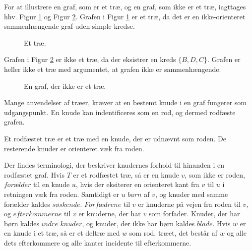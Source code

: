 \begin{exmp}
For at illustrere en graf, som er et træ, og en graf, som ikke er et træ, iagttages hhv. Figur \ref{eksempel_tree} og Figur \ref{eksempel_notree}. Grafen i Figur \ref{eksempel_tree} er et træ, da det er en ikke-orienteret sammenhængende graf uden simple kredse.
\end{exmp}

\begin{figure}[h]
\centering
{}
\caption{Et træ.} 
\label{eksempel_tree}
\end{figure}

Grafen i Figur \ref{eksempel_notree} er ikke et træ, da der eksistrer en kreds $\lbrace B, D, C \rbrace$. Grafen er heller ikke et træ med argumentet, at grafen ikke er sammenhængende.\\

\begin{figure}[h]
\centering
{}
\caption{En graf, der ikke er et træ.} 
\label{eksempel_notree}
\end{figure}

Mange anvendelser af træer, kræver at en bestemt knude i en graf fungerer som udgangspunkt. En knude kan indentificeres som en rod, og dermed rodfæste grafen.

\begin{defn}
Et rodfæstet træ er et træ med en knude, der er udnævnt som roden. De resterende knuder er orienteret væk fra roden.
\end{defn}

Der findes terminologi, der beskriver knudernes forhold til hinanden i en rodfæstet graf. 
Hvis $T$ er et rodfæstet træ, så er en knude $v$, som ikke er roden, $\textit{forælder}$ til en knude $u$, hvis der eksiterer en orienteret kant fra $v$ til $u$ i retningen væk fra roden.
Samtidigt er $u$ $\textit{barn}$ af $v$, og knuder med samme forælder kaldes $\textit{søskende}$. 
$\textit{Forfædrene}$ til $v$ er knuderne på vejen fra roden til $v$, og $\textit{efterkommerne}$ til $v$ er knuderne, der har $v$ som forfader. 
Knuder, der har børn kaldes $\textit{indre knuder}$, og knuder, der ikke har børn kaldes $\textit{blade}$.
Hvis $w$ er en knude i et træ, så er et deltræ med $w$ som rod, træet, det består af $w$ og alle dets efterkommere og alle kanter incidente til efterkommerne.

